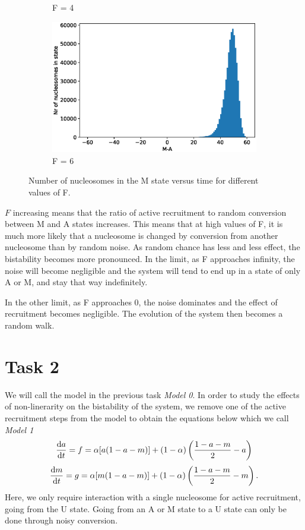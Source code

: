 \documentclass{article}
\begin{document}
\begin{figure}[H]
\begin{subfigure}[b]{.3\textwidth}
		\caption{F = 4}
		\label{fig:task1_F4_hist}
	\end{subfigure}
	\begin{subfigure}[b]{.3\textwidth}
		\centering
		\includegraphics[width= \linewidth]{figs2/task1_F6_hist_v4.eps}
		\caption{F = 6}
		\label{fig:task1_F6_hist}
	\end{subfigure}
		\caption{Number of nucleosomes in the M state versus time for different values of F. }
		\label{fig:task1}
\end{figure}
$F$ increasing means that the ratio of active recruitment to random conversion between M and A states increases. This means that at high values of F, it is much more likely that a nucleosome is changed by conversion from another nucleosome than by random noise. As random chance has less and less effect, the bistability becomes more pronounced. In the limit, as F approaches infinity, the noise will become negligible and the system will tend to end up in a state of only A or M, and stay that way indefinitely. 

In the other limit, as F approaches 0, the noise dominates and the effect of recruitment becomes negligible. The evolution of the system then becomes a random walk. 



\section{Task 2}
We will call the model in the previous task \textit{Model 0}. In order to study the effects of non-linerarity on the bistability of the system, we remove one of the active recruitment steps from the model to obtain the equations below which we call 
\textit{Model 1}
\begin{equation}
	\dv {a}{t} = f = \alpha[a(1-a-m)] + (1-\alpha )\left(\frac{1-a-m}{2}  - a\right)
\end{equation}
\begin{equation}
	\dv {m}{t} = g = \alpha[m(1-a-m)] + (1-\alpha )\left(\frac{1-a-m}{2}  - m\right).
\end{equation}
Here, we only require interaction with a single nucleosome for active recruitment, going from the U state. Going from an A or M state to a U state can only be done through noisy conversion. 
\end{document}
